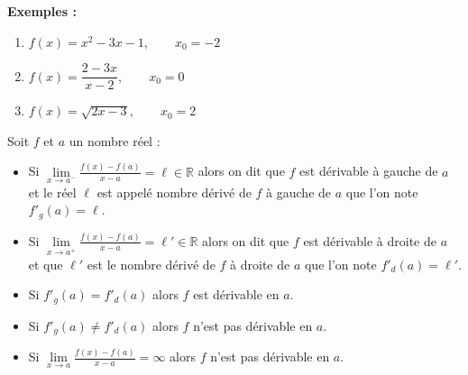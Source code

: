 \documentclass[12pt,a4paper]{article}
\begin{document}
\textbf{Exemples :}

\begin{enumerate}

    \item $f(x)=x^2-3x-1,\qquad x_0=-2$

    \item $f(x)=\dfrac{2-3x}{x-2},\qquad x_0=0$

    \item $f(x)=\sqrt{2x-3},\qquad x_0=2$

\end{enumerate}


\begin{tcolorbox}[
    colback=green!5,
    colframe=green!60!black,
    colbacktitle=green!60!black,
    title=\textbf{4. Dérivée à gauche et dérivée à droite},
    fonttitle=\bfseries,
    boxrule=0.8pt
]

Soit $f$ et $a$ un nombre réel :

\begin{itemize}

    \item Si
    \(
    \lim\limits_{x\to a^-}\frac{f(x)-f(a)}{x-a}
    =\ell\in\mathbb{R}
    \)
    alors on dit que $f$ est dérivable à gauche de $a$ et le réel
    $\ell$ est appelé nombre dérivé de $f$ à gauche de $a$ que l'on
    note $f'_g(a)=\ell$.

    \item Si
    \(
    \lim\limits_{x\to a^+}\frac{f(x)-f(a)}{x-a}
    =\ell'\in\mathbb{R}
    \)
    alors on dit que $f$ est dérivable à droite de $a$ et que
    $\ell'$ est le nombre dérivé de $f$ à droite de $a$ que l'on
    note $f'_d(a)=\ell'$.

\end{itemize}

\end{tcolorbox}


\begin{tcolorbox}[
    colback=green!5,
    colframe=green!60!black,
    colbacktitle=green!60!black,
    title=\textbf{Théorème :},
    fonttitle=\bfseries,
    boxrule=0.8pt
]

\begin{itemize}

    \item Si $f'_g(a)=f'_d(a)$ alors $f$ est dérivable en $a$.

    \item Si $f'_g(a)\neq f'_d(a)$ alors $f$ n'est pas dérivable en $a$.

    \item Si
    \(
    \lim\limits_{x\to a}\frac{f(x)-f(a)}{x-a}=\infty
    \)
    alors $f$ n'est pas dérivable en $a$.

\end{itemize}

\end{tcolorbox}
\end{document}
